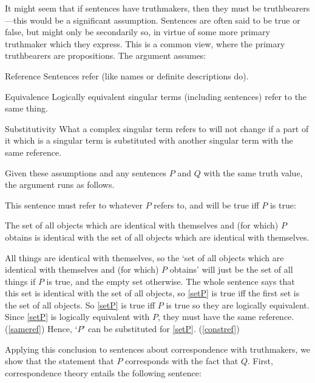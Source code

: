 It might seem that if sentences have truthmakers, then they must be truthbearers---this would be a significant assumption.
Sentences are often said to be true or false, but might only be secondarily so, in virtue of some more primary truthmaker which they express.
This is a common view, where the primary truthbearers are propositions.
The argument assumes:
\parencite[753]{Davidson_1969}

	\begin{principle}{Reference}\label{srefer}
	Sentences refer (like names or definite descriptions do).
	\end{principle}

	\begin{principle}{Equivalence}\label{sameref}
	Logically equivalent singular terms (including sentences) refer to the same thing.
	\end{principle}

	\begin{principle}{Substitutivity}\label{constref}
	What a complex singular term refers to will not change if a part of it which is a singular term is substituted with another singular term with the same reference.
	\end{principle}

Given these assumptions and any sentences $P$ and $Q$ with the same truth value, the argument runs as follows.

This sentence must refer to whatever $P$ refers to, and will be true iff $P$ is true:

	\begin{example}\label{setP}
	The set of all objects which are identical with themselves and (for which) $P$ obtains is identical with the set of all objects which are identical with themselves.
	\end{example}

All things are identical with themselves, so the `set of all objects which are identical with themselves and (for which) $P$ obtains' will just be the set of all things if $P$ is true, and the empty set otherwise.
The whole sentence says that this set is identical with the set of all objects, so \ref{setP} is true iff the first set is the set of all objects.
So \ref{setP} is true iff $P$ is true so they are logically equivalent.
Since \ref{setP} is logically equivalent with $P$, they must have the same reference.
(\ref{sameref})
Hence, `$P$' can be substituted for \ref{setP}.
(\ref{constref})

Applying this conclusion to sentences about correspondence with truthmakers, we show that the statement that $P$ corresponds with the fact that $Q$.
First, correspondence theory entails the following sentence:

